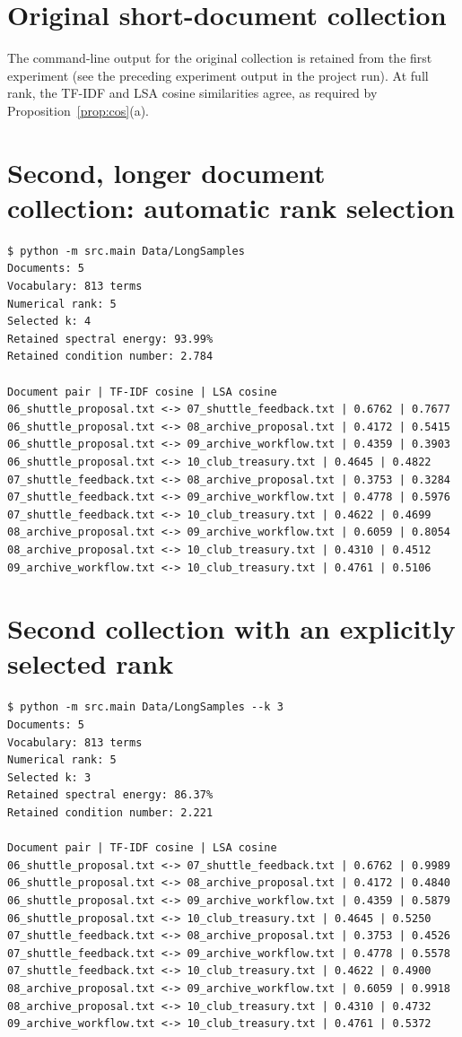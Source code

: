 \documentclass[12pt,a4paper]{report}
\theoremstyle{plain}
\theoremstyle{definition}
\theoremstyle{remark}
\theoremstyle{definition}
\begin{document}
\section{Original short-document collection}

The command-line output for the original collection is retained from the first experiment (see the preceding experiment output in the project run). At full rank, the TF-IDF and LSA cosine similarities agree, as required by Proposition~\ref{prop:cos}(a).

\section{Second, longer document collection: automatic rank selection}

\begin{verbatim}
$ python -m src.main Data/LongSamples
Documents: 5
Vocabulary: 813 terms
Numerical rank: 5
Selected k: 4
Retained spectral energy: 93.99%
Retained condition number: 2.784

Document pair | TF-IDF cosine | LSA cosine
06_shuttle_proposal.txt <-> 07_shuttle_feedback.txt | 0.6762 | 0.7677
06_shuttle_proposal.txt <-> 08_archive_proposal.txt | 0.4172 | 0.5415
06_shuttle_proposal.txt <-> 09_archive_workflow.txt | 0.4359 | 0.3903
06_shuttle_proposal.txt <-> 10_club_treasury.txt | 0.4645 | 0.4822
07_shuttle_feedback.txt <-> 08_archive_proposal.txt | 0.3753 | 0.3284
07_shuttle_feedback.txt <-> 09_archive_workflow.txt | 0.4778 | 0.5976
07_shuttle_feedback.txt <-> 10_club_treasury.txt | 0.4622 | 0.4699
08_archive_proposal.txt <-> 09_archive_workflow.txt | 0.6059 | 0.8054
08_archive_proposal.txt <-> 10_club_treasury.txt | 0.4310 | 0.4512
09_archive_workflow.txt <-> 10_club_treasury.txt | 0.4761 | 0.5106
\end{verbatim}

\section{Second collection with an explicitly selected rank}

\begin{verbatim}
$ python -m src.main Data/LongSamples --k 3
Documents: 5
Vocabulary: 813 terms
Numerical rank: 5
Selected k: 3
Retained spectral energy: 86.37%
Retained condition number: 2.221

Document pair | TF-IDF cosine | LSA cosine
06_shuttle_proposal.txt <-> 07_shuttle_feedback.txt | 0.6762 | 0.9989
06_shuttle_proposal.txt <-> 08_archive_proposal.txt | 0.4172 | 0.4840
06_shuttle_proposal.txt <-> 09_archive_workflow.txt | 0.4359 | 0.5879
06_shuttle_proposal.txt <-> 10_club_treasury.txt | 0.4645 | 0.5250
07_shuttle_feedback.txt <-> 08_archive_proposal.txt | 0.3753 | 0.4526
07_shuttle_feedback.txt <-> 09_archive_workflow.txt | 0.4778 | 0.5578
07_shuttle_feedback.txt <-> 10_club_treasury.txt | 0.4622 | 0.4900
08_archive_proposal.txt <-> 09_archive_workflow.txt | 0.6059 | 0.9918
08_archive_proposal.txt <-> 10_club_treasury.txt | 0.4310 | 0.4732
09_archive_workflow.txt <-> 10_club_treasury.txt | 0.4761 | 0.5372
\end{verbatim}
\end{document}
